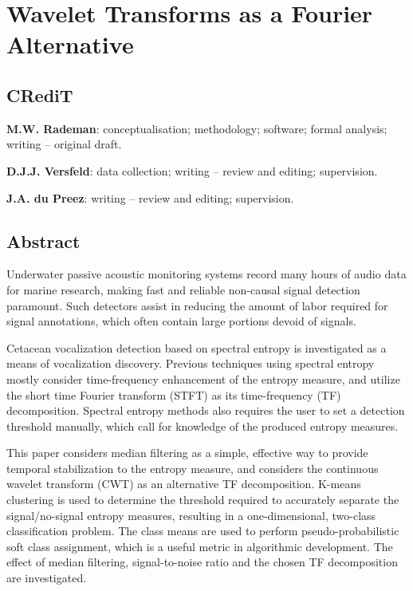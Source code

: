 \chapter{Wavelet Transforms as a Fourier Alternative}
\label{chap:p1}



\section*{CRediT}
\textbf{M.W. Rademan}: conceptualisation; methodology; software; formal analysis; writing -- original draft.

\textbf{D.J.J. Versfeld}: data collection; writing -- review and editing; supervision.

\textbf{J.A. du Preez}: writing -- review and editing; supervision.

\section*{Abstract}
Underwater passive acoustic monitoring systems record many hours of audio data for marine research, 
making fast and reliable non-causal signal detection paramount. Such detectors assist in reducing the amount of labor required for signal annotations, which often contain large portions devoid of signals.

Cetacean vocalization detection based on spectral entropy is investigated as a means of vocalization discovery. Previous techniques using spectral entropy mostly consider time-frequency enhancement of the entropy measure, and utilize the short time Fourier transform (STFT) as its time-frequency (TF) decomposition. Spectral entropy methods also requires the user to set a detection threshold manually, which call for knowledge of the produced entropy measures.

This paper considers median filtering as a simple, effective way to provide temporal stabilization to the entropy measure, and considers the continuous wavelet transform (CWT) as an alternative TF decomposition. K-means clustering is used to determine the threshold required to accurately separate the signal/no-signal entropy measures, resulting in a  one-dimensional, two-class classification problem. The class means are used to perform pseudo-probabilistic soft class assignment, which is a useful metric in algorithmic development. The effect of median filtering, signal-to-noise ratio and the chosen TF decomposition are investigated.

